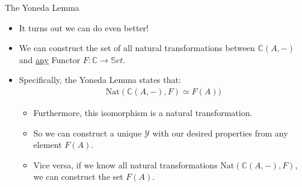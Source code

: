 \documentclass[aspectratio=169]{beamer} %
\newcommand{\bC}{\mathbb{C}}
\newcommand{\bS}{\mathbb{S}}
\newcommand{\mY}{\mathcal{Y}}
\begin{document}
\begin{frame}{The Yoneda Lemma}
    \begin{itemize}
        \item It turns out we can do even better!
        \pause\item We can construct the set of all natural transformations between $\bC(A, -)$ and \underline{any} Functor $F :\bC \to \bS et$.
        \pause\item Specifically, the Yoneda Lemma states that:
        \begin{align*}
          \text{Nat}(\bC(A,-), F) \simeq F(A))
        \end{align*}
        \begin{itemize}
          \vspace{-18pt}\pause\item Furthermore, this isomorphism is a natural transformation.
          \pause\item So we can construct a unique $\mY$ with our desired properties from any element $F(A)$.
          \pause\item Vice versa, if we know all natural transformations $\text{Nat}(\bC(A,-), F)$, we can construct the set $F(A)$.
        \end{itemize}
    \end{itemize}
\end{frame}

%
\end{document}
